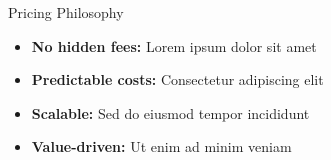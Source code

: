 \begin{sidebar}{Pricing Philosophy}
\begin{itemize}
    \item \textbf{No hidden fees:} Lorem ipsum dolor sit amet
    \item \textbf{Predictable costs:} Consectetur adipiscing elit
    \item \textbf{Scalable:} Sed do eiusmod tempor incididunt
    \item \textbf{Value-driven:} Ut enim ad minim veniam
\end{itemize}
\end{sidebar}

\textit{}
